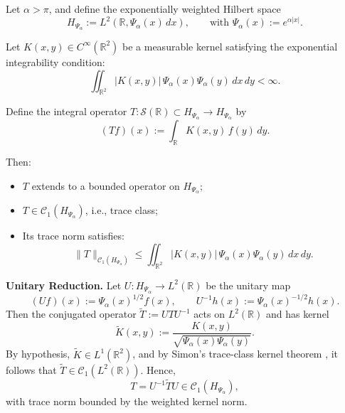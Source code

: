 \begin{lemma}
\label{lem:trace_class_via_weighted_L1}
Let \( \alpha > \pi \), and define the exponentially weighted Hilbert space
\[
H_{\Psi_\alpha} := L^2\left(\mathbb{R}, \Psi_\alpha(x)\, dx\right), \qquad \text{with } \Psi_\alpha(x) := e^{\alpha |x|}.
\]

Let \( K(x,y) \in C^\infty(\mathbb{R}^2) \) be a measurable kernel satisfying the exponential integrability condition:
\[
\iint_{\mathbb{R}^2} |K(x,y)|\, \Psi_\alpha(x) \Psi_\alpha(y)\, dx\, dy < \infty.
\]

Define the integral operator \( T \colon \mathcal{S}(\mathbb{R}) \subset H_{\Psi_\alpha} \to H_{\Psi_\alpha} \) by
\[
(Tf)(x) := \int_{\mathbb{R}} K(x,y)\, f(y)\, dy.
\]

Then:
\begin{itemize}
    \item \( T \) extends to a bounded operator on \( H_{\Psi_\alpha} \);
    \item \( T \in \mathcal{C}_1(H_{\Psi_\alpha}) \), i.e., trace class;
    \item Its trace norm satisfies:
    \[
    \|T\|_{\mathcal{C}_1(H_{\Psi_\alpha})} \le \iint_{\mathbb{R}^2} |K(x,y)|\, \Psi_\alpha(x)\Psi_\alpha(y)\, dx\, dy.
    \]
\end{itemize}

\medskip
\noindent\textbf{Unitary Reduction.}
Let \( U \colon H_{\Psi_\alpha} \to L^2(\mathbb{R}) \) be the unitary map
\[
(Uf)(x) := \Psi_\alpha(x)^{1/2} f(x), \qquad U^{-1} h(x) := \Psi_\alpha(x)^{-1/2} h(x).
\]
Then the conjugated operator \( \widetilde{T} := U T U^{-1} \) acts on \( L^2(\mathbb{R}) \) and has kernel
\[
\widetilde{K}(x,y) := \frac{K(x,y)}{\sqrt{\Psi_\alpha(x)\Psi_\alpha(y)}}.
\]
By hypothesis, \( \widetilde{K} \in L^1(\mathbb{R}^2) \), and by Simon’s trace-class kernel theorem \cite[Thm.~4.2]{Simon2005TraceIdeals}, it follows that \( \widetilde{T} \in \mathcal{C}_1(L^2(\mathbb{R})) \). Hence,
\[
T = U^{-1} \widetilde{T} U \in \mathcal{C}_1(H_{\Psi_\alpha}),
\]
with trace norm bounded by the weighted kernel norm.
\end{lemma}
